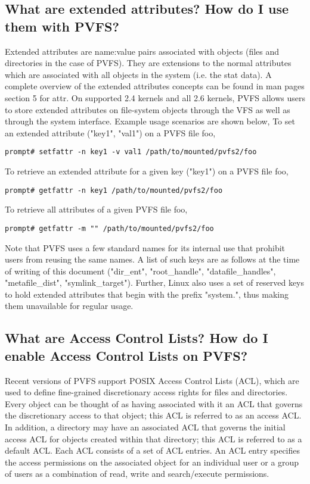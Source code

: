 \documentclass[11pt,letterpaper]{article}
\begin{document}
\subsection{What are extended attributes? How do I use them with PVFS?}
Extended attributes are name:value pairs associated with objects (files and directories
in the case of PVFS). They are extensions to the
normal attributes which are associated with all objects in the system (i.e. the stat data).
A complete overview of the extended attributes concepts can be found in man pages section 5 for attr.
On supported 2.4 kernels and all 2.6 kernels, PVFS allows users to store extended attributes
on file-system objects through the VFS as well as through the system interface. Example
usage scenarios are shown below,
To set an extended attribute ("key1", "val1") on a PVFS file foo,
\begin{verbatim}
prompt# setfattr -n key1 -v val1 /path/to/mounted/pvfs2/foo
\end{verbatim}
To retrieve an extended attribute for a given key ("key1") on a PVFS file foo,
\begin{verbatim}
prompt# getfattr -n key1 /path/to/mounted/pvfs2/foo
\end{verbatim}
To retrieve all attributes of a given PVFS file foo,
\begin{verbatim}
prompt# getfattr -m "" /path/to/mounted/pvfs2/foo
\end{verbatim}
Note that PVFS uses a few standard names for its internal use that prohibit users
from reusing the same names. A list of such keys are as follows at the time
of writing of this document ("dir\_ent", "root\_handle",
"datafile\_handles", "metafile\_dist", "symlink\_target"). Further, Linux also uses
a set of reserved keys to hold extended attributes that begin with the prefix "system.",
thus making them unavailable for regular usage.

\subsection{What are Access Control Lists? How do I enable Access Control Lists on PVFS?}
Recent versions of PVFS support POSIX Access Control Lists (ACL), which are used to define fine-grained 
discretionary access rights for files and directories. Every object can be thought of as having 
associated with it an ACL that governs the discretionary access to that object; this ACL
is referred to as an access ACL. In addition, a directory may have an associated ACL that 
governs the initial access ACL for objects created within that directory; this ACL 
is referred to as a default ACL. Each ACL consists of a set of ACL entries. An ACL entry 
specifies the access permissions on the associated object for an individual user or a group 
of users as a combination of read, write and search/execute permissions.
\end{document}
